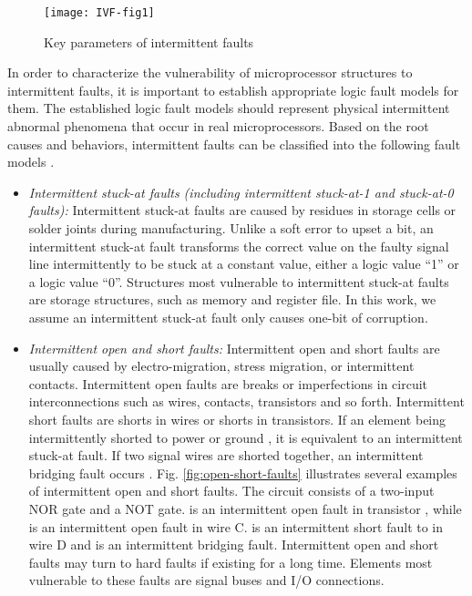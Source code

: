 \begin{figure}[t]
\centering
\texttt{[image: IVF-fig1]}
\caption{Key parameters of intermittent faults}
\label{fig:intermittent-faults} 
\end{figure}

In order to characterize the vulnerability of microprocessor structures to intermittent faults, it is important to establish appropriate logic fault models for them. The established logic fault models should represent physical intermittent abnormal phenomena that occur in real microprocessors. Based on the root causes and behaviors, intermittent faults can be classified into the following fault models \cite{gracia2008analysis} \cite{gil2003study}.

\begin{itemize}
    \item \textit{Intermittent stuck-at faults (including intermittent stuck-at-1 and stuck-at-0 faults):} Intermittent stuck-at faults are caused by residues in storage cells or solder joints during manufacturing. Unlike a soft error to upset a bit, an intermittent stuck-at fault transforms the correct value on the faulty signal line intermittently to be stuck at a constant value, either a logic value “1” or a logic value “0”. Structures most vulnerable to intermittent stuck-at faults are storage structures, such as memory and register file. In this work, we assume an intermittent stuck-at fault only causes one-bit of corruption.

    \item \textit{Intermittent open and short faults:} Intermittent open and short faults are usually caused by electro-migration, stress migration, or intermittent contacts. Intermittent open faults are breaks or imperfections in circuit interconnections such as wires, contacts, transistors and so forth. Intermittent short faults are shorts in wires or shorts in transistors. If an element being intermittently shorted to power or ground , it is equivalent to an intermittent stuck-at fault. If two signal wires are shorted together, an intermittent bridging fault occurs \cite{wang2006vlsi}. Fig. \ref{fig:open-short-faults} illustrates several examples of intermittent open and short faults. The circuit consists of a two-input NOR gate and a NOT gate. is an intermittent open fault in transistor , while is an intermittent open fault in wire C. is an intermittent short fault to in wire D and is an intermittent bridging fault. Intermittent open and short faults may turn to hard faults if existing for a long time. Elements most vulnerable to these faults are signal buses and I/O connections.


\end{itemize}
